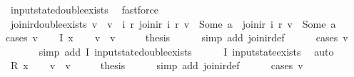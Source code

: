 \begin{isabellebody}
\ input{}state{\isacharunderscore}double{\isacharunderscore}exists\ \isamarkupfalse%
\ fastforce\isanewline
{}\isamarkupfalse%
%
\endisatagproof
{\isafoldproof}%
%
\isadelimproof
\isanewline
%
\endisadelimproof
\isanewline
{}\isamarkupfalse%
\ join{\isacharunderscore}ir{\isacharunderscore}double{\isacharunderscore}exists{\isacharunderscore}{}{\isacharcolon}\ {\isachardoublequoteopen}v\ {\isasymnoteq}\ v{\isacharprime}\ {\isasymLongrightarrow}\ {\isasymexists}i\ r{\isachardot}\ join{\isacharunderscore}ir\ i\ r\ v\ {\isacharequal}\ Some\ a\ {\isasymand}\ join{\isacharunderscore}ir\ i\ r\ v{\isacharprime}\ {\isacharequal}\ Some\ a{\isacharprime}{\isachardoublequoteclose}\isanewline
%
\isadelimproof
%
\endisadelimproof
%
\isatagproof
{}\isamarkupfalse%
{\isacharparenleft}cases\ v{\isacharparenright}\isanewline
\ \ \isamarkupfalse%
\ {\isacharparenleft}I\ x{}{\isacharparenright}\isanewline
\ \ \isamarkupfalse%
\ {\isachardoublequoteopen}v\ {\isasymnoteq}\ v{\isacharprime}{\isachardoublequoteclose}\isanewline
\ \ \isamarkupfalse%
\ \isamarkupfalse%
\ {\isacharquery}thesis\isanewline
\ \ \ \ \isamarkupfalse%
\ {\isacharparenleft}simp\ add{\isacharcolon}\ join{\isacharunderscore}ir{\isacharunderscore}def{\isacharparenright}\isanewline
\ \ \ \ \isamarkupfalse%
\ {\isacharparenleft}cases\ v{\isacharprime}{\isacharparenright}\isanewline
\ \ \ \ \ \isamarkupfalse%
\ {\isacharparenleft}simp\ add{\isacharcolon}\ I\ input{}state{\isacharunderscore}double{\isacharunderscore}exists{\isacharunderscore}{}{\isacharparenright}\isanewline
\ \ \ \ \isamarkupfalse%
\ I\ input{}state{\isacharunderscore}exists\ \isamarkupfalse%
\ auto\isanewline
{}\isamarkupfalse%
\isanewline
\ \ \isamarkupfalse%
\ {\isacharparenleft}R\ x{}{\isacharparenright}\isanewline
\ \ \isamarkupfalse%
\ {\isachardoublequoteopen}v\ {\isasymnoteq}\ v{\isacharprime}{\isachardoublequoteclose}\isanewline
\ \ \isamarkupfalse%
\ \isamarkupfalse%
\ {\isacharquery}thesis\isanewline
\ \ \ \ \isamarkupfalse%
\ {\isacharparenleft}simp\ add{\isacharcolon}\ join{\isacharunderscore}ir{\isacharunderscore}def{\isacharparenright}\isanewline
\ \ \ \ \isamarkupfalse%
\ {\isacharparenleft}cases\ v{\isacharprime}{\isacharparenright}\isanewline

\end{isabellebody}
